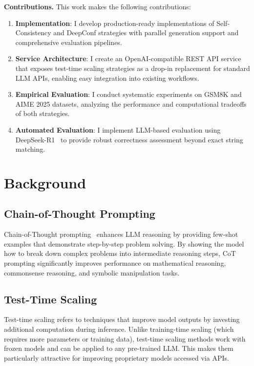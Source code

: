 \documentclass[11pt]{article}
\begin{document}
\textbf{Contributions.} This work makes the following contributions:
\begin{enumerate}
    \item \textbf{Implementation}: I develop production-ready implementations of Self-Consistency and DeepConf strategies with parallel generation support and comprehensive evaluation pipelines.
    \item \textbf{Service Architecture}: I create an OpenAI-compatible REST API service that exposes test-time scaling strategies as a drop-in replacement for standard LLM APIs, enabling easy integration into existing workflows.
    \item \textbf{Empirical Evaluation}: I conduct systematic experiments on GSM8K and AIME 2025 datasets, analyzing the performance and computational tradeoffs of both strategies.
    \item \textbf{Automated Evaluation}: I implement LLM-based evaluation using DeepSeek-R1~\cite{sun2024deep} to provide robust correctness assessment beyond exact string matching.
\end{enumerate}

\section{Background}

\subsection{Chain-of-Thought Prompting}

Chain-of-Thought prompting~\cite{wei2022chain} enhances LLM reasoning by providing few-shot examples that demonstrate step-by-step problem solving. By showing the model how to break down complex problems into intermediate reasoning steps, CoT prompting significantly improves performance on mathematical reasoning, commonsense reasoning, and symbolic manipulation tasks.

\subsection{Test-Time Scaling}

Test-time scaling refers to techniques that improve model outputs by investing additional computation during inference. Unlike training-time scaling (which requires more parameters or training data), test-time scaling methods work with frozen models and can be applied to any pre-trained LLM. This makes them particularly attractive for improving proprietary models accessed via APIs.
\end{document}

